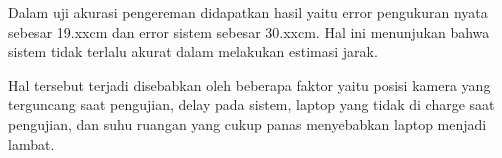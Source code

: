     Dalam uji akurasi pengereman didapatkan hasil yaitu error pengukuran nyata sebesar 19.xxcm dan error sistem sebesar 30.xxcm. Hal ini menunjukan bahwa sistem tidak terlalu akurat dalam melakukan estimasi jarak. 

    Hal tersebut terjadi disebabkan oleh beberapa faktor yaitu posisi kamera yang terguncang saat pengujian, delay pada sistem, laptop yang tidak di charge saat pengujian, dan suhu ruangan yang cukup panas menyebabkan laptop menjadi lambat.